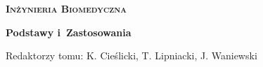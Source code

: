 \thispagestyle{empty}

\begin{center}
	
	{\Huge \textbf{\textsc{Inżynieria Biomedyczna}}}
	
	\vspace{1cm}
	
	{\huge  \textbf{Podstawy i~Zastosowania}}
	
	\vspace{3cm}
{\Large Redaktorzy tomu: K. Cieślicki, T. Lipniacki, J. Waniewski}
\end{center}
